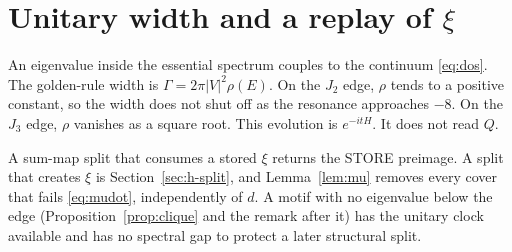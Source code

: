 \section{\texorpdfstring{Unitary width and a replay of \(\xi\)}{Unitary width and a replay of xi}}
\label{sec:h-splitdecay}

An eigenvalue inside the essential spectrum couples to the continuum
\eqref{eq:dos}.
The golden-rule width is \(\Gamma=2\pi|V|^2\rho(E)\).
On the \(J_2\) edge, \(\rho\) tends to a positive constant, so the width does
not shut off as the resonance approaches \(-8\).
On the \(J_3\) edge, \(\rho\) vanishes as a square root.
This evolution is \(e^{-itH}\).
It does not read \(Q\).

A sum-map split that consumes a stored \(\xi\) returns the STORE preimage.
A split that creates \(\xi\) is Section~\ref{sec:h-split}, and
Lemma~\ref{lem:mu} removes every cover that fails \eqref{eq:mudot},
independently of \(d\).
A motif with no eigenvalue below the edge
(Proposition~\ref{prop:clique} and the remark after it)
has the unitary clock available and has no spectral gap to protect a
later structural split.

